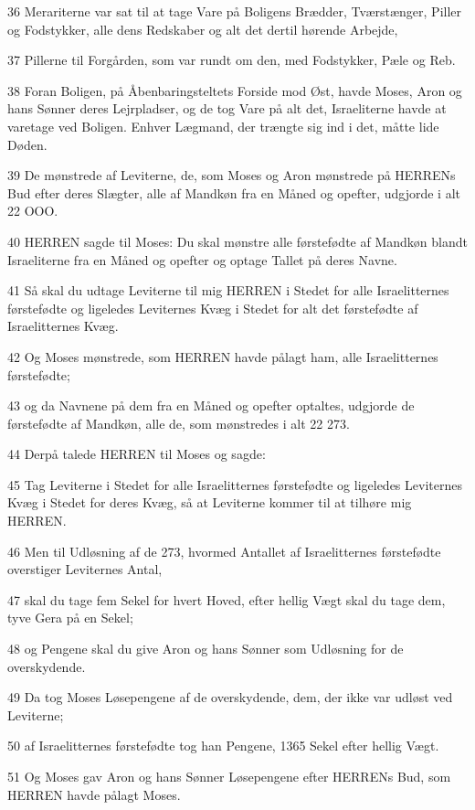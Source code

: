 \par 36 Merariterne var sat til at tage Vare på Boligens Brædder, Tværstænger, Piller og Fodstykker, alle dens Redskaber og alt det dertil hørende Arbejde,
\par 37 Pillerne til Forgården, som var rundt om den, med Fodstykker, Pæle og Reb.
\par 38 Foran Boligen, på Åbenbaringsteltets Forside mod Øst, havde Moses, Aron og hans Sønner deres Lejrpladser, og de tog Vare på alt det, Israeliterne havde at varetage ved Boligen. Enhver Lægmand, der trængte sig ind i det, måtte lide Døden.
\par 39 De mønstrede af Leviterne, de, som Moses og Aron mønstrede på HERRENs Bud efter deres Slægter, alle af Mandkøn fra en Måned og opefter, udgjorde i alt 22 OOO.
\par 40 HERREN sagde til Moses: Du skal mønstre alle førstefødte af Mandkøn blandt Israeliterne fra en Måned og opefter og optage Tallet på deres Navne.
\par 41 Så skal du udtage Leviterne til mig HERREN i Stedet for alle Israelitternes førstefødte og ligeledes Leviternes Kvæg i Stedet for alt det førstefødte af Israelitternes Kvæg.
\par 42 Og Moses mønstrede, som HERREN havde pålagt ham, alle Israelitternes førstefødte;
\par 43 og da Navnene på dem fra en Måned og opefter optaltes, udgjorde de førstefødte af Mandkøn, alle de, som mønstredes i alt 22 273.
\par 44 Derpå talede HERREN til Moses og sagde:
\par 45 Tag Leviterne i Stedet for alle Israelitternes førstefødte og ligeledes Leviternes Kvæg i Stedet for deres Kvæg, så at Leviterne kommer til at tilhøre mig HERREN.
\par 46 Men til Udløsning af de 273, hvormed Antallet af Israelitternes førstefødte overstiger Leviternes Antal,
\par 47 skal du tage fem Sekel for hvert Hoved, efter hellig Vægt skal du tage dem, tyve Gera på en Sekel;
\par 48 og Pengene skal du give Aron og hans Sønner som Udløsning for de overskydende.
\par 49 Da tog Moses Løsepengene af de overskydende, dem, der ikke var udløst ved Leviterne;
\par 50 af Israelitternes førstefødte tog han Pengene, 1365 Sekel efter hellig Vægt.
\par 51 Og Moses gav Aron og hans Sønner Løsepengene efter HERRENs Bud, som HERREN havde pålagt Moses.

